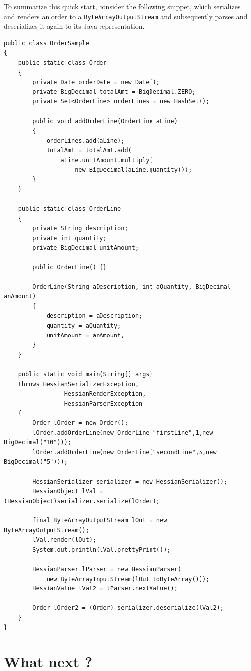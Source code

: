 \documentclass[a4paper]{article}
\begin{document}
To summarize this quick start, consider the following snippet, which serializes and renders an order to a \lstinline$ByteArrayOutputStream$ and subsequently parses and deserializes it again to its Java representation.

\medskip
\begin{lstlisting}
public class OrderSample
{
    public static class Order
    {
        private Date orderDate = new Date();
        private BigDecimal totalAmt = BigDecimal.ZERO;
        private Set<OrderLine> orderLines = new HashSet();

        public void addOrderLine(OrderLine aLine)
        {
            orderLines.add(aLine);
            totalAmt = totalAmt.add(
                aLine.unitAmount.multiply(
                    new BigDecimal(aLine.quantity)));
        }
    }

    public static class OrderLine
    {
        private String description;
        private int quantity;
        private BigDecimal unitAmount;

        public OrderLine() {}
        
        OrderLine(String aDescription, int aQuantity, BigDecimal anAmount)
        {
            description = aDescription;
            quantity = aQuantity;
            unitAmount = anAmount;
        }
    }

    public static void main(String[] args) 
    throws HessianSerializerException, 
                 HessianRenderException, 
                 HessianParserException
    {
        Order lOrder = new Order();
        lOrder.addOrderLine(new OrderLine("firstLine",1,new BigDecimal("10")));
        lOrder.addOrderLine(new OrderLine("secondLine",5,new BigDecimal("5")));

        HessianSerializer serializer = new HessianSerializer();
        HessianObject lVal = (HessianObject)serializer.serialize(lOrder);

        final ByteArrayOutputStream lOut = new ByteArrayOutputStream();
        lVal.render(lOut);
        System.out.println(lVal.prettyPrint());

        HessianParser lParser = new HessianParser(
            new ByteArrayInputStream(lOut.toByteArray()));
        HessianValue lVal2 = lParser.nextValue();

        Order lOrder2 = (Order) serializer.deserialize(lVal2);
    }
}
\end{lstlisting}
\medskip

\section{What next ?}
\end{document}

